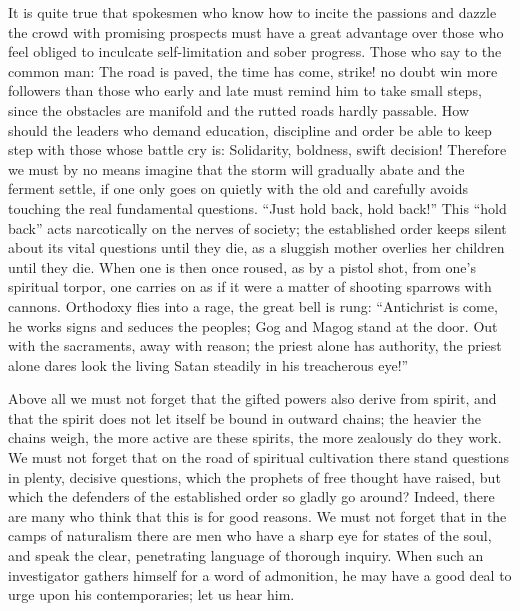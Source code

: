 \documentclass[12pt,a4paper,openany]{book}
\newcommand{\opage}[1]{\marginnote{\footnotesize\textit{[#1]}}}
\begin{document}
It is quite true that spokesmen who know how to
incite the passions and dazzle the crowd with promising
\setcounter{footnote}{0}%
\opage{97}prospects must have a great advantage over those who
feel obliged to inculcate self-limitation
and sober progress. Those who say to the common
man: The road is paved, the time has come, strike!
no doubt win more followers than those who early and
late must remind him to take small steps, since
the obstacles are manifold and the rutted roads hardly
passable. How should the leaders who demand
education, discipline and order be able to keep step with
those whose battle cry is: Solidarity, boldness, swift
decision! Therefore we must by no means imagine that
the storm will gradually abate and the ferment settle,
if one only goes on quietly with the old
and carefully avoids touching the real fundamental questions.
``Just hold back, hold back!'' This
``hold back'' acts narcotically on the nerves of society;
the established order keeps silent about its vital questions until they die, as a
sluggish mother overlies her children until they die. When one is then
once roused, as by a pistol shot, from one's spiritual
torpor, one carries on as if it were a matter of shooting
sparrows with cannons. Orthodoxy flies into a rage,
the great bell is rung: ``Antichrist
is come, he works signs and seduces the peoples; Gog
and Magog stand at the door. Out with the sacraments,
away with reason; the priest alone has authority, the
priest alone dares look the living Satan steadily in his treacherous
eye!''

Above all we must not forget that the gifted powers
also derive from spirit, and that the spirit does not let itself be
bound in outward chains; the heavier the chains weigh, the
more active are these spirits, the more zealously do they
work. We must not forget that on the road of spiritual
\setcounter{footnote}{0}%
\opage{98}cultivation there stand questions in plenty, decisive questions,
which the prophets of free thought have raised, but
which the defenders of the established order so gladly go
around? Indeed, there are many who think that this is for good
reasons. We must not forget that in the camps of naturalism
there are men who have a sharp eye for states of the soul,
and speak the clear, penetrating language of thorough
inquiry. When such an investigator gathers
himself for a word of admonition, he may have a good deal to
urge upon his contemporaries; let us hear him.
\end{document}
